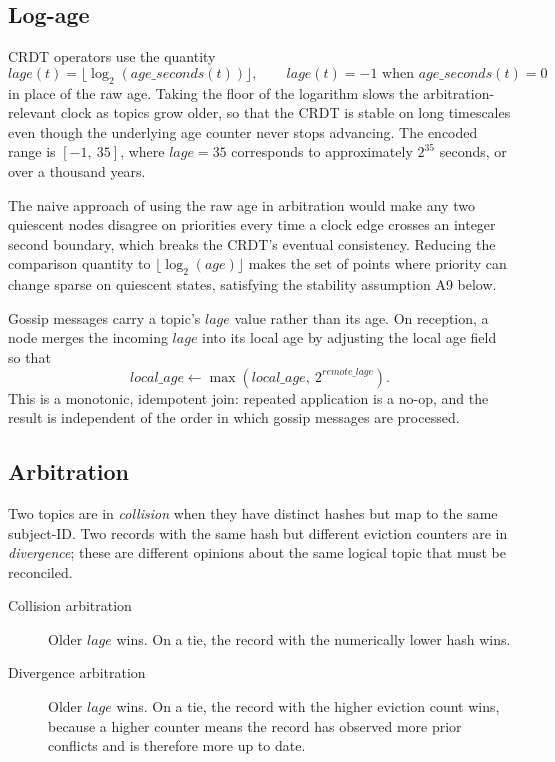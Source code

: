 \subsection{Log-age}

CRDT operators use the quantity
\[
    \mathit{lage}(t) = \lfloor \log_2(\mathit{age\_seconds}(t)) \rfloor,
    \qquad \mathit{lage}(t) = -1 \text{ when } \mathit{age\_seconds}(t) = 0
\]
in place of the raw age.
Taking the floor of the logarithm slows the arbitration-relevant clock as topics
grow older, so that the CRDT is stable on long timescales even though the underlying
age counter never stops advancing. The encoded range is $[-1,\ 35]$, where
$\mathit{lage} = 35$ corresponds to approximately $2^{35}$ seconds, or over a
thousand years.

\begin{remark}
    The naive approach of using the raw age in arbitration would make any two
    quiescent nodes disagree on priorities every time a clock edge crosses an
    integer second boundary, which breaks the CRDT's eventual consistency.
    Reducing the comparison quantity to $\lfloor \log_2(\mathit{age}) \rfloor$
    makes the set of points where priority can change sparse on quiescent states,
    satisfying the stability assumption A9 below.
\end{remark}

Gossip messages carry a topic's $\mathit{lage}$ value rather than its age.
On reception, a node merges the incoming $\mathit{lage}$ into its local age by
adjusting the local age field so that
\[
    \mathit{local\_age} \leftarrow \max\left(\mathit{local\_age},\ 2^{\mathit{remote\_lage}}\right).
\]
This is a monotonic, idempotent join: repeated application is a no-op, and the
result is independent of the order in which gossip messages are processed.

\subsection{Arbitration}

Two topics are in \emph{collision} when they have distinct hashes but map to the
same subject-ID. Two records with the same hash but different eviction counters
are in \emph{divergence}; these are different opinions about the same logical topic
that must be reconciled.

\begin{description}
    \item[Collision arbitration] Older $\mathit{lage}$ wins. On a tie, the record
    with the numerically lower hash wins.
    \item[Divergence arbitration] Older $\mathit{lage}$ wins. On a tie, the record
    with the higher eviction count wins, because a higher counter means the record
    has observed more prior conflicts and is therefore more up to date.
\end{description}

